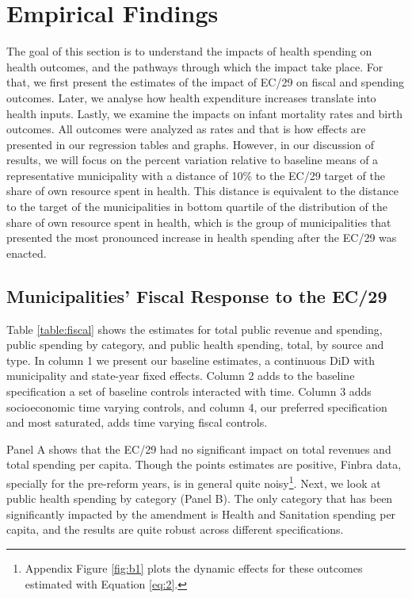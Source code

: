 \section{Empirical Findings}\label{sec:results}

The goal of this section is to understand the impacts of health spending on health outcomes, and the pathways through which the impact take place. For that, we first present the estimates of the impact of EC/29 on fiscal and spending outcomes. Later, we analyse how health expenditure increases translate into health inputs. Lastly, we examine the impacts on infant mortality rates and birth outcomes. All outcomes were analyzed as rates and that is how effects are presented in our regression tables and graphs. However, in our discussion of results, we will focus on the percent variation relative to baseline means of a representative municipality with a distance of 10\% to the EC/29 target of the share of own resource spent in health. This distance is equivalent to the distance to the target of the municipalities in bottom quartile of the distribution of the share of own resource spent in health, which is the group of municipalities that presented the most pronounced increase in health spending after the EC/29 was enacted.


\subsection{Municipalities' Fiscal Response to the EC/29}\label{sec:results_fiscal}

Table \ref{table:fiscal} shows the estimates for total public revenue and spending, public spending by category, and public health spending, total, by source and type. In column 1 we present our baseline estimates, a continuous DiD with municipality and state-year fixed effects. Column 2 adds to the baseline specification a set of baseline controls interacted with time. Column 3 adds socioeconomic time varying controls, and column 4, our preferred specification and most saturated, adds time varying fiscal controls. 

Panel A shows that the EC/29 had no significant impact on total revenues and total spending per capita. Though the points estimates are positive, Finbra data, specially for the pre-reform years, is in general quite noisy\footnote{Appendix Figure \ref{fig:b1} plots the dynamic effects for these outcomes estimated with Equation \ref{eq:2}.}. Next, we look at public health spending by category (Panel B). The only category that has been significantly impacted by the amendment is Health and Sanitation spending per capita, and the results are quite robust across different specifications. 

